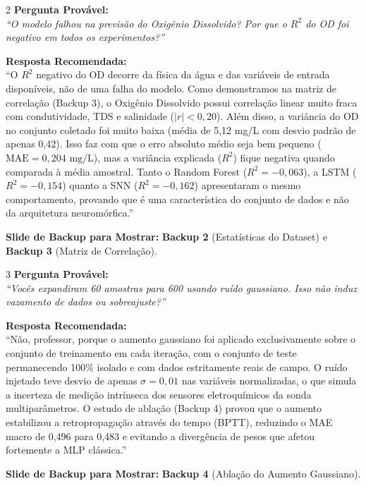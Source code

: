 \documentclass[11pt,a4paper]{article}
\begin{document}
\begin{qnabox}{2}
\textbf{Pergunta Provável:}\\
\textit{``O modelo falhou na previsão do Oxigênio Dissolvido? Por que o $R^2$ do OD foi negativo em todos os experimentos?''}

\vspace{0.2cm}
\textbf{Resposta Recomendada:}\\
``O $R^2$ negativo do OD decorre da física da água e das variáveis de entrada disponíveis, não de uma falha do modelo. Como demonstramos na matriz de correlação (Backup 3), o Oxigênio Dissolvido possui correlação linear muito fraca com condutividade, TDS e salinidade ($|r| < 0{,}20$). Além disso, a variância do OD no conjunto coletado foi muito baixa (média de 5,12 mg/L com desvio padrão de apenas 0,42). Isso faz com que o erro absoluto médio seja bem pequeno ($\text{MAE} = 0{,}204\text{ mg/L}$), mas a variância explicada ($R^2$) fique negativa quando comparada à média amostral. Tanto o Random Forest ($R^2 = -0{,}063$), a LSTM ($R^2 = -0{,}154$) quanto a SNN ($R^2 = -0{,}162$) apresentaram o mesmo comportamento, provando que é uma característica do conjunto de dados e não da arquitetura neuromórfica.''

\vspace{0.2cm}
\textbf{Slide de Backup para Mostrar:} \textbf{Backup 2} (Estatísticas do Dataset) e \textbf{Backup 3} (Matriz de Correlação).
\end{qnabox}

\begin{qnabox}{3}
\textbf{Pergunta Provável:}\\
\textit{``Vocês expandiram 60 amostras para 600 usando ruído gaussiano. Isso não induz vazamento de dados ou sobreajuste?''}

\vspace{0.2cm}
\textbf{Resposta Recomendada:}\\
``Não, professor, porque o aumento gaussiano foi aplicado exclusivamente sobre o conjunto de treinamento em cada iteração, com o conjunto de teste permanecendo 100\% isolado e com dados estritamente reais de campo. O ruído injetado teve desvio de apenas $\sigma = 0{,}01$ nas variáveis normalizadas, o que simula a incerteza de medição intrínseca dos sensores eletroquímicos da sonda multiparâmetros. O estudo de ablação (Backup 4) provou que o aumento estabilizou a retropropagação através do tempo (BPTT), reduzindo o MAE macro de 0,496 para 0,483 e evitando a divergência de pesos que afetou fortemente a MLP clássica.''

\vspace{0.2cm}
\textbf{Slide de Backup para Mostrar:} \textbf{Backup 4} (Ablação do Aumento Gaussiano).
\end{qnabox}
\end{document}
